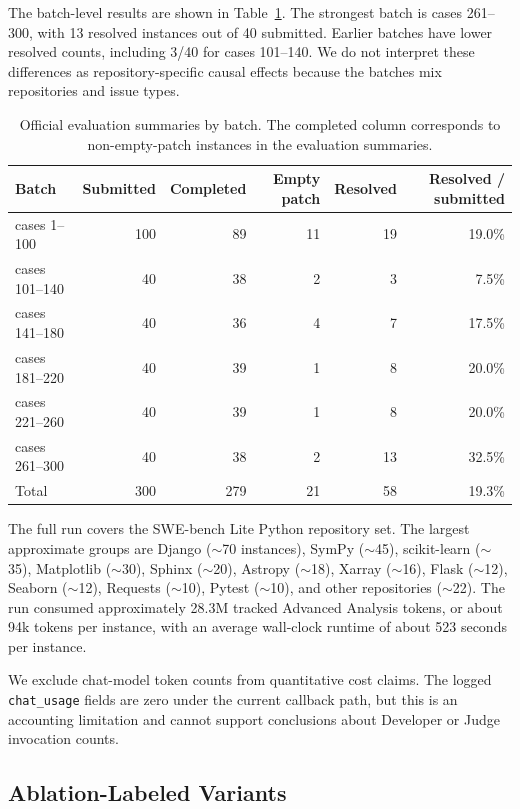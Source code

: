 \documentclass[11pt]{article}
\begin{document}
The batch-level results are shown in Table~\ref{tab:batch-results}.  The strongest batch is cases 261--300, with 13 resolved instances out of 40 submitted.  Earlier batches have lower resolved counts, including 3/40 for cases 101--140.  We do not interpret these differences as repository-specific causal effects because the batches mix repositories and issue types.

\begin{table}[t]
\centering
\small
\begin{tabular}{lrrrrr}
\toprule
Batch & Submitted & Completed & Empty patch & Resolved & Resolved / submitted \\
\midrule
cases 1--100 & 100 & 89 & 11 & 19 & 19.0\% \\
cases 101--140 & 40 & 38 & 2 & 3 & 7.5\% \\
cases 141--180 & 40 & 36 & 4 & 7 & 17.5\% \\
cases 181--220 & 40 & 39 & 1 & 8 & 20.0\% \\
cases 221--260 & 40 & 39 & 1 & 8 & 20.0\% \\
cases 261--300 & 40 & 38 & 2 & 13 & 32.5\% \\
\midrule
Total & 300 & 279 & 21 & 58 & 19.3\% \\
\bottomrule
\end{tabular}
\caption{Official evaluation summaries by batch.  The completed column corresponds to non-empty-patch instances in the evaluation summaries.}
\label{tab:batch-results}
\end{table}

The full run covers the SWE-bench Lite Python repository set.  The largest approximate groups are Django ($\sim$70 instances), SymPy ($\sim$45), scikit-learn ($\sim$35), Matplotlib ($\sim$30), Sphinx ($\sim$20), Astropy ($\sim$18), Xarray ($\sim$16), Flask ($\sim$12), Seaborn ($\sim$12), Requests ($\sim$10), Pytest ($\sim$10), and other repositories ($\sim$22).  The run consumed approximately 28.3M tracked Advanced Analysis tokens, or about 94k tokens per instance, with an average wall-clock runtime of about 523 seconds per instance.

We exclude chat-model token counts from quantitative cost claims.  The logged \texttt{chat\_usage} fields are zero under the current callback path, but this is an accounting limitation and cannot support conclusions about Developer or Judge invocation counts.

\subsection{Ablation-Labeled Variants}
\label{subsec:ablation-results}
\end{document}
